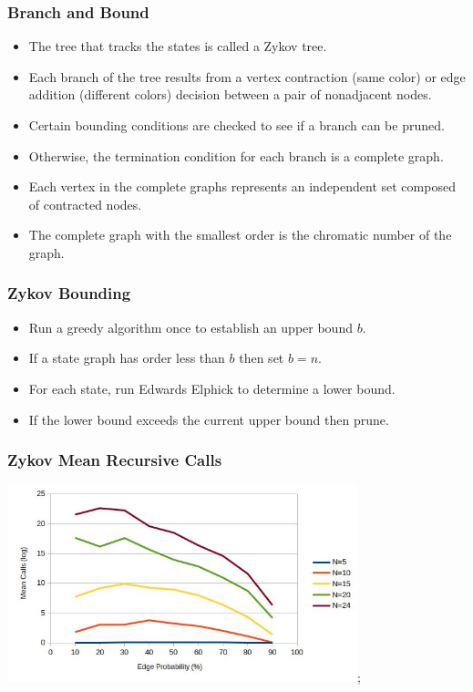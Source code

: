 \documentclass{beamer}
\begin{document}
\begin{frame}
  \frametitle{Branch and Bound}
  \begin{itemize}
  \item The tree that tracks the states is called a Zykov tree.
  \item Each branch of the tree results from a vertex contraction (same color) or edge addition (different colors)
    decision between a pair of nonadjacent nodes.
  \item Certain bounding conditions are checked to see if a branch can be pruned.
  \item Otherwise, the termination condition for each branch is a complete graph.
  \item Each vertex in the complete graphs represents an independent set composed of contracted nodes.
  \item The complete graph with the smallest order is the chromatic number of the graph.
  \end{itemize}
\end{frame}

\begin{frame}
  \frametitle{Zykov Bounding}
  \begin{itemize}
  \item Run a greedy algorithm once to establish an upper bound \(b\).
  \item If a state graph has order less than \(b\) then set \(b=n\).
  \item For each state, run Edwards Elphick to determine a lower bound.
  \item If the lower bound exceeds the current upper bound then prune.
  \end{itemize}
\end{frame}

\begin{frame}
  \frametitle{Zykov Mean Recursive Calls}
  \begin{center}
    \includegraphics[width=4in]{../final/zykov_calls};
  \end{center}
\end{frame}
\end{document}
